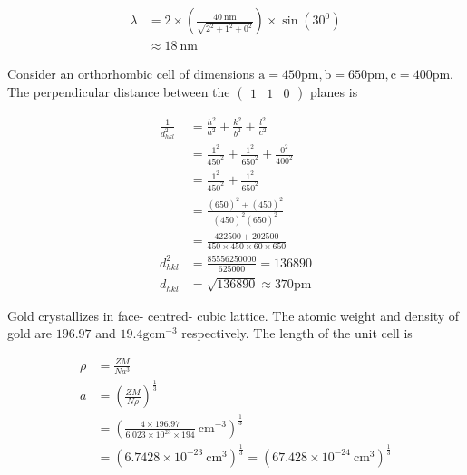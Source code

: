 \begin{enumerate}
\begin{answer}
$$\begin{aligned}
		\lambda &=2 \times\left(\frac{40 \mathrm{~nm}}{\sqrt{2^{2}+1^{2}+0^{2}}}\right) \times \sin \left(30^{0}\right) \\
		& \approx 18 \mathrm{~nm}
		\end{aligned}
		$$	
	\end{answer}
	\begin{minipage}{\textwidth}
		\item Consider an orthorhombic cell of dimensions $\mathrm{a}=450 \mathrm{pm}, \mathrm{b}=650 \mathrm{pm}, \mathrm{c}=400 \mathrm{pm} .$ The perpendicular distance between the $\left(\begin{array}{lll}1 & 1 & 0\end{array}\right)$ planes is
	\end{minipage}
	\begin{answer}
		$$
		\begin{aligned}
		\frac{1}{d_{h k l}^{2}} &=\frac{h^{2}}{a^{2}}+\frac{k^{2}}{b^{2}}+\frac{l^{2}}{c^{2}} \\
		&=\frac{1^{2}}{450^{2}}+\frac{1^{2}}{650^{2}}+\frac{0^{2}}{400^{2}} \\
		&=\frac{1^{2}}{450^{2}}+\frac{1^{2}}{650^{2}} \\
		&=\frac{(650)^{2}+(450)^{2}}{(450)^{2}(650)^{2}} \\
		&=\frac{422500+202500}{450 \times 450 \times 60 \times 650} \\
		d_{h k l}^{2} &=\frac{85556250000}{625000}=136890 \\
		d_{h k l} &=\sqrt{136890} \approx 370 \mathrm{pm}
		\end{aligned}
		$$	
	\end{answer}
	\begin{minipage}{\textwidth}
		\item Gold crystallizes in face- centred- cubic lattice. The atomic weight and density of gold are $196.97$ and $19.4 \mathrm{gcm}^{-3}$ respectively. The length of the unit cell is
	\end{minipage}
	\begin{answer}
		$$
		\begin{aligned}
		\rho &=\frac{Z M}{N a^{3}} \\
		a &=\left(\frac{Z M}{N \rho}\right)^{\frac{1}{3}} \\
		&=\left(\frac{4 \times 196.97}{6.023 \times 10^{23} \times 194} \mathrm{~cm}^{-3}\right)^{\frac{1}{3}} \\
		&=\left(6.7428 \times 10^{-23} \mathrm{~cm}^{3}\right)^{\frac{1}{3}}=\left(67.428 \times 10^{-24} \mathrm{~cm}^{3}\right)^{\frac{1}{3}} \\

\end{aligned}$$
\end{answer}
\end{enumerate}
